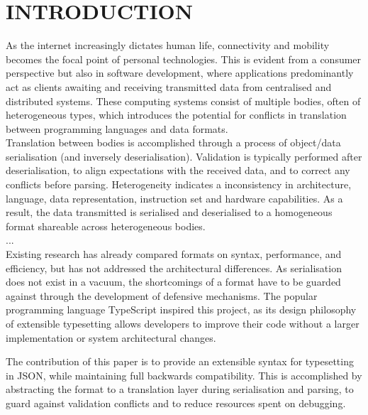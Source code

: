 \documentclass[../report.tex]{subfiles}
\begin{document}
\section{INTRODUCTION}

As the internet increasingly dictates human life, connectivity and mobility becomes the focal point of personal technologies. This is evident from a consumer perspective but also in software development, where applications predominantly act as clients awaiting and receiving transmitted data from centralised and distributed systems. These computing systems consist of multiple bodies, often of heterogeneous types, which introduces the potential for conflicts in translation between programming languages and data formats. \\

Translation between bodies is accomplished through a process of object/data serialisation (and inversely deserialisation). Validation is typically performed after deserialisation, to align expectations with the received data, and to correct any conflicts before parsing. Heterogeneity indicates a inconsistency in architecture, language, data representation, instruction set and hardware capabilities. As a result, the data transmitted is serialised and deserialised to a homogeneous format shareable across heterogeneous bodies. \\

... \\

Existing research has already compared formats on syntax, performance, and efficiency, but has not addressed the architectural differences. As serialisation does not exist in a vacuum, the shortcomings of a format have to be guarded against through the development of defensive mechanisms. The popular programming language TypeScript inspired this project, as its design philosophy of extensible typesetting allows developers to improve their code without a larger implementation or system architectural changes.

The contribution of this paper is to provide an extensible syntax for typesetting in JSON, while maintaining full backwards compatibility. This is accomplished by abstracting the format to a translation layer during serialisation and parsing, to guard against validation conflicts and to reduce resources spent on debugging.


\end{document}
